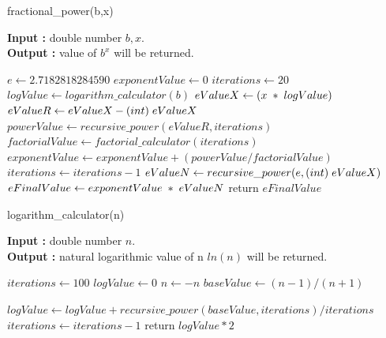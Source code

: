 \documentclass[12pt, a4paper]{article}
\begin{document}
\newpage
\begin{algorithm}[hbt!]
\renewcommand{\thealgorithm}{2.2}
\caption{fractional\_power(b,x)}\label{alg:two}

\hspace*{\algorithmicindent} \textbf{Input : }double number $b,x$. \\
\hspace*{\algorithmicindent} \textbf{Output : }value of $b^x$ will be returned.
\begin{algorithmic}[1]
\STATE $e \gets 2.7182818284590$
\STATE $exponentValue \gets 0$
\STATE $iterations \gets 20$
\STATE $logValue \gets logarithm\_calculator(b)$
\STATE $eValueX \gets (x \hspace{1mm} * \hspace{1mm} logValue)$
\STATE $eValueR \gets eValueX - (int)\hspace{1mm}eValueX$
  \STATE $powerValue \gets recursive\_power(eValueR , iterations) $
  \STATE $factorialValue \gets factorial\_calculator(iterations)$ 
  \STATE $exponentValue \gets exponentValue + (powerValue / factorialValue)$
  \STATE $iterations \gets iterations - 1$
\ENDWHILE
\STATE $eValueN \gets recursive\_power(e, (int) \hspace{1mm} eValueX)$
\STATE $eFinalValue \gets exponentValue \hspace{1mm}*\hspace{1mm} eValueN$
\STATE return $eFinalValue$
\end{algorithmic}
\end{algorithm}
\vspace*{-.4cm}
\begin{algorithm}[hbt!]
\renewcommand{\thealgorithm}{2.3}
\caption{logarithm\_calculator(n)}\label{alg:two}

\hspace*{\algorithmicindent} \textbf{Input : }double number $n$. \\
\hspace*{\algorithmicindent} \textbf{Output : }natural logarithmic value of n $ln(n)$ will be returned.
\begin{algorithmic}[1]

\STATE $iterations \gets 100$
\STATE $logValue \gets 0 $
  \STATE $n \gets -n$
\ENDIF
\STATE $baseValue \gets (n - 1) / (n + 1) $

  \STATE $logValue \gets logValue + recursive\_power(baseValue , iterations) / iterations $
  \ENDIF
  \STATE $iterations \gets iterations - 1$
\ENDWHILE
\STATE return $logValue * 2$

\end{algorithmic}
\end{algorithm}
\end{document}
